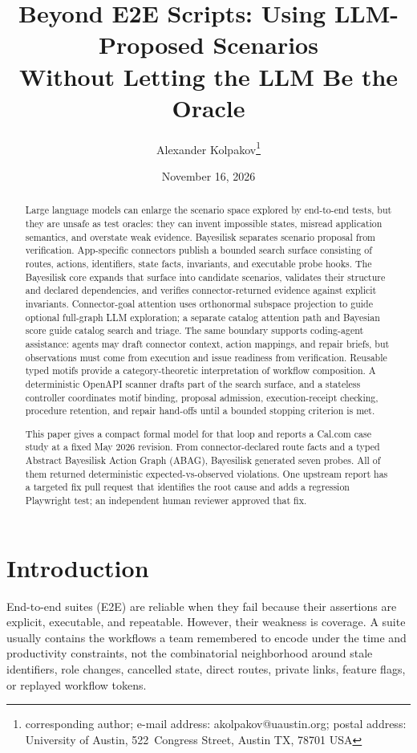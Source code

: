 \documentclass[10pt]{article}
\title{%
Beyond E2E Scripts: Using LLM-Proposed Scenarios \\
Without Letting the LLM Be the Oracle}
\author{Alexander Kolpakov\footnote{corresponding author; e-mail address: akolpakov@uaustin.org; postal address: University of Austin, 522~Congress Street, Austin TX, 78701 USA}}
\date{November 16, 2026}
\begin{document}
\maketitle

\begin{abstract}
Large language models can enlarge the scenario space explored by end-to-end tests, but they are unsafe as test oracles: they can invent impossible states, misread application semantics, and overstate weak evidence. Bayesilisk separates scenario proposal from verification. App-specific connectors publish a bounded search surface consisting of routes, actions, identifiers, state facts, invariants, and executable probe hooks. The Bayesilisk core expands that surface into candidate scenarios, validates their structure and declared dependencies, and verifies connector-returned evidence against explicit invariants. Connector-goal attention uses orthonormal subspace projection to guide optional full-graph LLM exploration; a separate catalog attention path and Bayesian score guide catalog search and triage. The same boundary supports coding-agent assistance: agents may draft connector context, action mappings, and repair briefs, but observations must come from execution and issue readiness from verification. Reusable typed motifs provide a category-theoretic interpretation of workflow composition. A deterministic OpenAPI scanner drafts part of the search surface, and a stateless controller coordinates motif binding, proposal admission, execution-receipt checking, procedure retention, and repair hand-offs until a bounded stopping criterion is met.

This paper gives a compact formal model for that loop and reports a Cal.com case study at a fixed May 2026 revision. From connector-declared route facts and a typed Abstract Bayesilisk Action Graph (ABAG), Bayesilisk generated seven probes. All of them returned deterministic expected-vs-observed violations. One upstream report has a targeted fix pull request that identifies the root cause and adds a regression Playwright test; an independent human reviewer approved that fix.
\end{abstract}

\section{Introduction}

End-to-end suites (E2E) are reliable when they fail because their assertions are
explicit, executable, and repeatable. However, their weakness is coverage. A suite usually contains the workflows a team remembered to encode under the time and productivity constraints, not the combinatorial neighborhood around stale identifiers, role changes, cancelled state, direct routes, private links, feature flags, or replayed workflow tokens.
\end{document}
